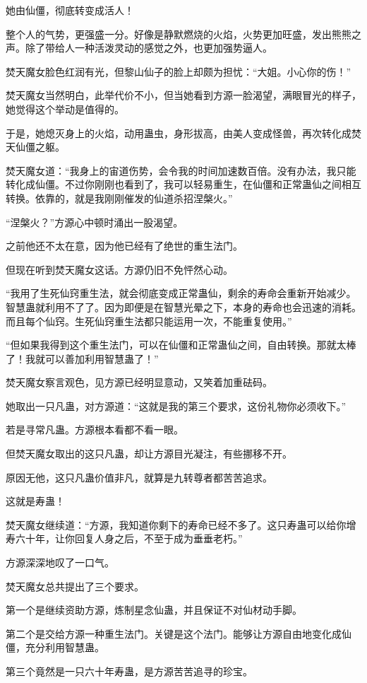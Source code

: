 \begin{this_body}
她由仙僵，彻底转变成活人！

整个人的气势，更强盛一分。好像是静默燃烧的火焰，火势更加旺盛，发出熊熊之声。除了带给人一种活泼灵动的感觉之外，也更加强势逼人。

焚天魔女脸色红润有光，但黎山仙子的脸上却颇为担忧：“大姐。小心你的伤！”

焚天魔女当然明白，此举代价不小，但当她看到方源一脸渴望，满眼冒光的样子，她觉得这个举动是值得的。

于是，她熄灭身上的火焰，动用蛊虫，身形拔高，由美人变成怪兽，再次转化成焚天仙僵之躯。

焚天魔女道：“我身上的宙道伤势，会令我的时间加速数百倍。没有办法，我只能转化成仙僵。不过你刚刚也看到了，我可以轻易重生，在仙僵和正常蛊仙之间相互转换。依靠的，就是我刚刚催发的仙道杀招涅槃火。”

“涅槃火？”方源心中顿时涌出一股渴望。

之前他还不太在意，因为他已经有了绝世的重生法门。

但现在听到焚天魔女这话。方源仍旧不免怦然心动。

“我用了生死仙窍重生法，就会彻底变成正常蛊仙，剩余的寿命会重新开始减少。智慧蛊就利用不了了。因为即便是在智慧光晕之下，本身的寿命也会迅速的消耗。而且每个仙窍。生死仙窍重生法都只能运用一次，不能重复使用。”

“但如果我得到这个重生法门，可以在仙僵和正常蛊仙之间，自由转换。那就太棒了！我就可以善加利用智慧蛊了！”

焚天魔女察言观色，见方源已经明显意动，又笑着加重砝码。

她取出一只凡蛊，对方源道：“这就是我的第三个要求，这份礼物你必须收下。”

若是寻常凡蛊。方源根本看都不看一眼。

但焚天魔女取出的这只凡蛊，却让方源目光凝注，有些挪移不开。

原因无他，这只凡蛊价值非凡，就算是九转尊者都苦苦追求。

这就是寿蛊！

焚天魔女继续道：“方源，我知道你剩下的寿命已经不多了。这只寿蛊可以给你增寿六十年，让你回复人身之后，不至于成为垂垂老朽。”

方源深深地叹了一口气。

焚天魔女总共提出了三个要求。

第一个是继续资助方源，炼制星念仙蛊，并且保证不对仙材动手脚。

第二个是交给方源一种重生法门。关键是这个法门。能够让方源自由地变化成仙僵，充分利用智慧蛊。

第三个竟然是一只六十年寿蛊，是方源苦苦追寻的珍宝。


\end{this_body}
